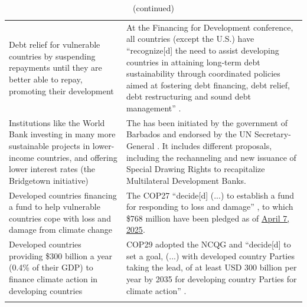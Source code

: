 \begin{table}[H]
\caption*{(continued)}
\begin{tabular}{p{5cm}p{11cm}}
Debt relief for vulnerable countries by suspending repayments until they are better able to repay, promoting their development  & At the Financing for Development conference, all countries (except the U.S.) have ``recognize[d] the need to assist developing countries in attaining long-term debt sustainability through coordinated policies aimed at fostering debt financing, debt relief, debt restructuring and sound debt management'' \citep{ffd4_outcome_2025}. \\ %
Institutions like the World Bank investing in many more sustainable projects in lower-income countries, and offering lower interest rates (the Bridgetown initiative)  & The \cite{bridgetown_initiative_bridgetown_2025} has been initiated by the government of Barbados and endorsed by the UN Secretary-General \citep{un_press_2023}. It includes different proposals, including the rechanneling and new issuance of Special Drawing Rights to recapitalize Multilateral Development Banks. \\ \addlinespace 
Developed countries financing a fund to help vulnerable countries cope with loss and damage from climate change  & The COP27 ``decide[d] (...) to establish a fund for responding to loss and damage'' \citep{cop27_decision_2022}, to which \$768 million have been pledged as of \href{https://unfccc.int/event/pledges-to-the-fund-for-responding-to-loss-and-damage}{April 7, 2025}. \\ \addlinespace 
Developed countries providing \$300 billion a year (0.4\% of their GDP) to finance climate action in developing countries  & COP29 adopted the NCQG and ``decide[d] to set a goal, (...) with developed country Parties taking the lead, of at least USD 300 billion per year by 2035 for developing country Parties for climate action'' \citep{unfccc_new_2024}. \\ \addlinespace 

\end{tabular}
\end{table}
